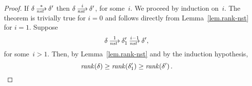 
\thmranknstx*
\begin{proof}
  If $\delta\nst[*]\delta'$ then $\delta\nst[i]\delta'$, for some~$i$.  We
  proceed by induction on~$i$.  The theorem is trivially true for $i=0$ and
  follows directly from Lemma~\ref{lem.rank-nst} for $i=1$.  Suppose
  \[
    \delta\nst[1]\delta_1'\nst[i-1]\delta',
  \]
  for some~$i>1$.  Then, by Lemma~\ref{lem.rank-nst} and by the induction
  hypothesis,
  \[
    \operatorname{\mathit{rank}}(\delta)\ge\operatorname{\mathit{rank}}(\delta_1')\ge\operatorname{\mathit{rank}}(\delta')\,.\qedhere
  \]
\end{proof}


